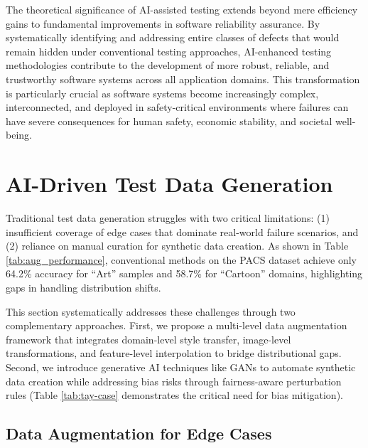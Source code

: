 \documentclass[manuscript,screen,review]{acmart}
\begin{document}
The theoretical significance of AI-assisted testing extends beyond mere efficiency gains to fundamental improvements in software reliability assurance. By systematically identifying and addressing entire classes of defects that would remain hidden under conventional testing approaches, AI-enhanced testing methodologies contribute to the development of more robust, reliable, and trustworthy software systems across all application domains. This transformation is particularly crucial as software systems become increasingly complex, interconnected, and deployed in safety-critical environments where failures can have severe consequences for human safety, economic stability, and societal well-being.

\section{AI-Driven Test Data Generation}

Traditional test data generation struggles with two critical limitations: (1) insufficient coverage of edge cases that dominate real-world failure scenarios, and (2) reliance on manual curation for synthetic data creation. As shown in Table \ref{tab:aug_performance}, conventional methods on the PACS dataset achieve only 64.2\% accuracy for ``Art'' samples and 58.7\% for ``Cartoon'' domains, highlighting gaps in handling distribution shifts.

This section systematically addresses these challenges through two complementary approaches. First, we propose a multi-level data augmentation framework that integrates domain-level style transfer, image-level transformations, and feature-level interpolation to bridge distributional gaps. Second, we introduce generative AI techniques like GANs to automate synthetic data creation while addressing bias risks through fairness-aware perturbation rules (Table \ref{tab:tay-case} demonstrates the critical need for bias mitigation).

\subsection{Data Augmentation for Edge Cases}
\end{document}
